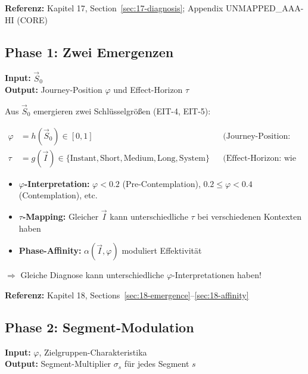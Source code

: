 \textbf{Referenz:} Kapitel 17, Section~\ref{sec:17-diagnosis}; Appendix UNMAPPED_AAA-HI (CORE)

\subsection{Phase 1: Zwei Emergenzen}
\label{sec:20-phase1}

\textbf{Input:} $\vec{S}_0$\\
\textbf{Output:} Journey-Position $\varphi$ und Effect-Horizon $\tau$

Aus $\vec{S}_0$ emergieren zwei Schlüsselgrößen (EIT-4, EIT-5):

\begin{align}
\varphi &= h(\vec{S}_0) \in [0,1] && \text{(Journey-Position: wo steht die Zielgruppe?)} \\
\tau &= g(\vec{I}) \in \{\text{Instant}, \text{Short}, \text{Medium}, \text{Long}, \text{System}\} && \text{(Effect-Horizon: wie schnell wirken Interventionen?)}
\end{align}

\begin{tcolorbox}[colback=orange!5!white, colframe=orange!75!black,
    title=\textbf{Variabilität in Phase 1}]
\begin{itemize}[nosep]
\item \textbf{$\varphi$-Interpretation:} $\varphi < 0.2$ (Pre-Contemplation), $0.2 \leq \varphi < 0.4$ (Contemplation), etc.
\item \textbf{$\tau$-Mapping:} Gleicher $\vec{I}$ kann unterschiedliche $\tau$ bei verschiedenen Kontexten haben
\item \textbf{Phase-Affinity:} $\alpha(\vec{I}, \varphi)$ moduliert Effektivität
\end{itemize}
$\Rightarrow$ Gleiche Diagnose kann unterschiedliche $\varphi$-Interpretationen haben!
\end{tcolorbox}

\textbf{Referenz:} Kapitel 18, Sections~\ref{sec:18-emergence}--\ref{sec:18-affinity}

\subsection{Phase 2: Segment-Modulation}
\label{sec:20-phase2}

\textbf{Input:} $\varphi$, Zielgruppen-Charakteristika\\
\textbf{Output:} Segment-Multiplier $\sigma_s$ für jedes Segment $s$

